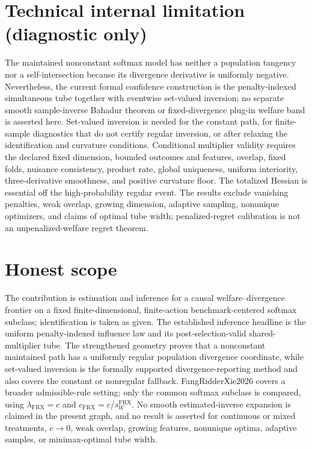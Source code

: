 \documentclass{article}
\begin{document}
\section*{Technical internal limitation (diagnostic only)}

The maintained nonconstant softmax model has neither a population tangency nor a self-intersection because its divergence derivative is uniformly negative. Nevertheless, the current formal confidence construction is the penalty-indexed simultaneous tube together with eventwise set-valued inversion; no separate smooth sample-inverse Bahadur theorem or fixed-divergence plug-in welfare band is asserted here. Set-valued inversion is needed for the constant path, for finite-sample diagnostics that do not certify regular inversion, or after relaxing the identification and curvature conditions. Conditional multiplier validity requires the declared fixed dimension, bounded outcomes and features, overlap, fixed folds, nuisance consistency, product rate, global uniqueness, uniform interiority, three-derivative smoothness, and positive curvature floor. The totalized Hessian is essential off the high-probability regular event. The results exclude vanishing penalties, weak overlap, growing dimension, adaptive sampling, nonunique optimizers, and claims of optimal tube width; penalized-regret calibration is not an unpenalized-welfare regret theorem.

\section{Honest scope}

The contribution is estimation and inference for a causal welfare--divergence frontier on a fixed finite-dimensional, finite-action benchmark-centered softmax subclass; identification is taken as given. The established inference headline is the uniform penalty-indexed influence law and its post-selection-valid shared-multiplier tube. The strengthened geometry proves that a nonconstant maintained path has a uniformly regular population divergence coordinate, while set-valued inversion is the formally supported divergence-reporting method and also covers the constant or nonregular fallback. FangRidderXie2026 covers a broader admissible-rule setting; only the common softmax subclass is compared, using \(\lambda_{\mathrm{FRX}}=c\) and \(c_{\mathrm{FRX}}=c/s_W^{\mathrm{FRX}}\). No smooth estimated-inverse expansion is claimed in the present graph, and no result is asserted for continuous or mixed treatments, \(c\to0\), weak overlap, growing features, nonunique optima, adaptive samples, or minimax-optimal tube width.
\end{document}
